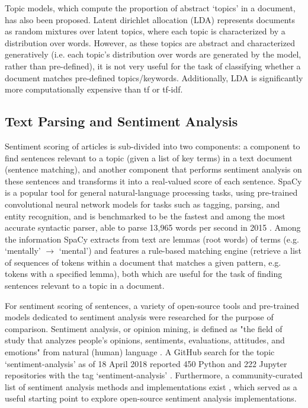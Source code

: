 \documentclass{report}
\begin{document}
Topic models, which compute the proportion of abstract `topics' in a document, has also been proposed.
Latent dirichlet allocation (LDA) \cite{blei2003latent} represents documents as random mixtures over latent topics, where each topic is characterized by a distribution over words.
However, as these topics are abstract and characterized generatively (i.e. each topic's distribution over words are generated by the model, rather than pre-defined), it is not very useful for the task of classifying whether a document matches pre-defined topics/keywords.
Additionally, LDA is significantly more computationally expensive than tf or tf-idf.

\subsection{Text Parsing and Sentiment Analysis} \label{tc-sentiment}
Sentiment scoring of articles is sub-divided into two components: a component to find sentences relevant to a topic (given a list of key terms) in a text document (sentence matching), and another component that performs sentiment analysis on these sentences and transforms it into a real-valued score of each sentence. 
SpaCy \cite{SpaCy} is a popular tool for general natural-language processing tasks, using pre-trained convolutional neural network models for tasks such as tagging, parsing, and entity recognition, and is benchmarked to be the fastest and among the most accurate syntactic parser, able to parse 13,965 words per second in 2015 \cite{choi2015depends}.
Among the information SpaCy extracts from text are lemmas (root words) of terms (e.g. `mentally' $\rightarrow$ `mental') and features a rule-based matching engine (retrieve a list of sequences of tokens within a document that matches a given pattern, e.g. tokens with a specified lemma), both which are useful for the task of finding sentences relevant to a topic in a document.

For sentiment scoring of sentences, a variety of open-source tools and pre-trained models dedicated to sentiment analysis were researched for the purpose of comparison.
Sentiment analysis, or opinion mining, is defined as "the field of study that analyzes people's opinions, sentiments, evaluations, attitudes, and emotions" from natural (human) language \cite{liu2012sentiment}.
A GitHub search for the topic `sentiment-analysis' as of 18 April 2018 reported 450 Python and 222 Jupyter repositories with the tag `sentiment-analysis' \cite{GitHub-sentiment-analysis}.
Furthermore, a community-curated list of sentiment analysis methods and implementations exist \cite{awesome-sentiment-analysis}, which served as a useful starting point to explore open-source sentiment analysis implementations.
\end{document}
